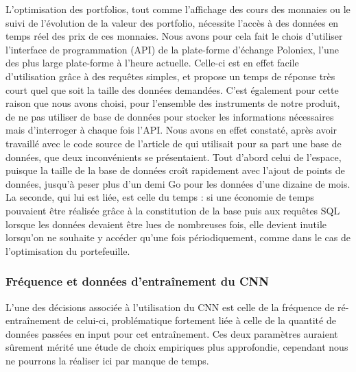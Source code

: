 \documentclass[a4paper, 10pt]{article}
\begin{document}
L'optimisation des portfolios, tout comme l'affichage des cours des monnaies ou le suivi de l'évolution de la valeur des portfolio, nécessite l'accès à des données en temps réel des prix de ces monnaies. Nous avons pour cela fait le chois d'utiliser l'interface de programmation (API) de la plate-forme d'échange Poloniex, l'une des plus large plate-forme à l'heure actuelle. Celle-ci est en effet facile d'utilisation grâce à des requêtes simples, et propose un temps de réponse très court quel que soit la taille des données demandées. C'est également pour cette raison que nous avons choisi, pour l'ensemble des instruments de notre produit, de ne pas utiliser de base de données pour stocker les informations nécessaires mais d'interroger à chaque fois l'API. Nous avons en effet constaté, après avoir travaillé avec le code source de l'article de \citet{Jiang2017} qui utilisait pour sa part une base de données, que deux inconvénients se présentaient. Tout d'abord celui de l'espace, puisque la taille de la base de données croît rapidement avec l'ajout de points de données, jusqu'à peser plus d'un demi Go pour les données d'une dizaine de mois. La seconde, qui lui est liée, est celle du temps : si une économie de temps pouvaient être réalisée grâce à la constitution de la base puis aux requêtes SQL lorsque les données devaient être lues de nombreuses fois, elle devient inutile lorsqu'on ne souhaite y accéder qu'une fois périodiquement, comme dans le cas de l'optimisation du portefeuille.

\subsubsection{Fréquence et données d'entraînement du CNN}

L'une des décisions associée à l'utilisation du CNN est celle de la fréquence de ré-entraînement de celui-ci, problématique fortement liée à celle de la quantité de données passées en input pour cet entraînement. Ces deux paramètres auraient sûrement mérité une étude de choix empiriques plus approfondie, cependant nous ne pourrons la réaliser ici par manque de temps.
\end{document}
